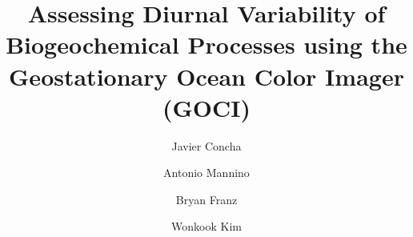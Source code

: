 \documentclass[onecolumn,3p,letterpaper,11pt]{elsarticle}
\begin{document}

\begin{frontmatter}

\title{Assessing Diurnal Variability of Biogeochemical Processes using the Geostationary Ocean Color Imager (GOCI)}


\author[oeladdress,usraaddress]{Javier Concha}

\author[oeladdress]{Antonio Mannino}

\author[oeladdress]{Bryan Franz}


\author[kiostaddress]{Wonkook Kim}


\address[oeladdress]{Ocean Ecology Lab, NASA Goddard Space Flight Center, Greenbelt, MD, USA}
\address[usraaddress]{Universities Space Research Association, Columbia, MD, USA}
\address[kiostaddress]{Korea Institute of Ocean Science and Technology, 787 Haean-ro, Ansan, Republic of Korea}

\begin{abstract}


\end{abstract}
\end{frontmatter}
\end{document}
